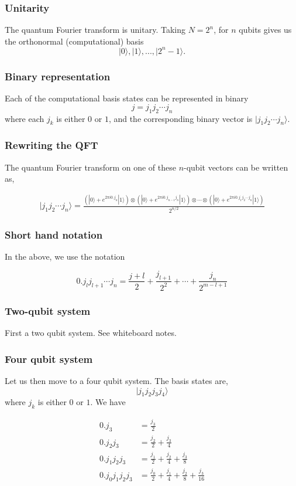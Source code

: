 \documentclass{beamer}
\begin{document}
\begin{frame}
\frametitle{Unitarity}

The quantum Fourier transform is unitary. Taking \(N = 2^n\),
for \(n\) qubits gives us the orthonormal (computational) basis
\[
|0\rangle, |1\rangle, ..., |2^{n}-1\rangle.
\]
\end{frame}

\begin{frame}
\frametitle{Binary representation}

Each of the computational basis states can be represented in binary
\[
j = j_1j_2 \cdots j_n
\]
where each \(j_k\) is either \(0\) or \(1\), and the corresponding
binary vector is \(|j_1j_2 \cdots j_n\rangle\).
\end{frame}

\begin{frame}
\frametitle{Rewriting the QFT}

The quantum Fourier
transform on one of these \(n\)-qubit vectors can be written as,

\begin{align*}
|j_1j_2 \cdots j_n \rangle = \frac{\left(|0\rangle +e^{2\pi i0.j_n}|1\rangle\right) \otimes \left(|0\rangle +e^{2\pi i0.j_{n-1}j_n}|1\rangle\right) \otimes \cdots \otimes \left(|0\rangle +e^{2\pi i0.j_1j_2 \cdots j_n}|1\rangle\right)}{2^{n/2}}
\end{align*}
\end{frame}

\begin{frame}
\frametitle{Short hand notation}

In the above, we use the notation

\[
0.j_lj_{l+1} \cdots j_n = \frac{j+l}{2} + \frac{j_{l+1}}{2^2} + \cdots + \frac{j_n}{2^{m-l+1}}
\]
\end{frame}

\begin{frame}
\frametitle{Two-qubit system}

First a two qubit system. See whiteboard notes.
\end{frame}

\begin{frame}
\frametitle{Four qubit system}

Let us then move to  a four qubit system. The basis states are,
\[
|j_1j_2j_3j_4 \rangle
\]
where \(j_k\) is either \(0\) or \(1\). We have

\begin{align*}
0.j_3 &= \frac{j_3}{2} \\
0.j_2j_3 &= \frac{j_2}{2} + \frac{j_3}{4} \\
0.j_1j_2j_3 &= \frac{j_1}{2} + \frac{j_2}{4} + \frac{j_3}{8} \\
0.j_0j_1j_2j_3 &= \frac{j_0}{2} + \frac{j_1}{4} + \frac{j_2}{8} + \frac{j_3}{16} \\
\end{align*}
\end{frame}
\end{document}
